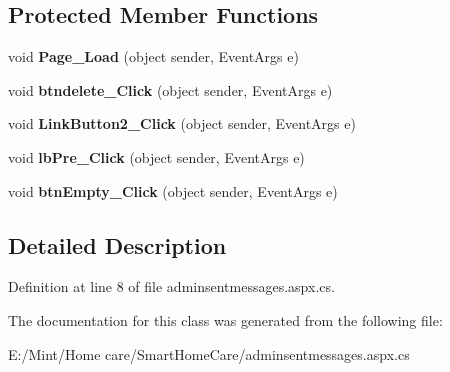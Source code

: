 \subsection*{Protected Member Functions}
\begin{DoxyCompactItemize}
\item 
\hypertarget{classadminsentmessages_a002928c0327e8c487949d9e6207b9f2f}{void {\bfseries Page\-\_\-\-Load} (object sender, Event\-Args e)}\label{classadminsentmessages_a002928c0327e8c487949d9e6207b9f2f}

\item 
\hypertarget{classadminsentmessages_a48aac92fad16543e878e38514956d8a6}{void {\bfseries btndelete\-\_\-\-Click} (object sender, Event\-Args e)}\label{classadminsentmessages_a48aac92fad16543e878e38514956d8a6}

\item 
\hypertarget{classadminsentmessages_ad2efc9592870c548d36ef5ba6dd52fd7}{void {\bfseries Link\-Button2\-\_\-\-Click} (object sender, Event\-Args e)}\label{classadminsentmessages_ad2efc9592870c548d36ef5ba6dd52fd7}

\item 
\hypertarget{classadminsentmessages_a2818cf63646056dacf6cc9818174a61d}{void {\bfseries lb\-Pre\-\_\-\-Click} (object sender, Event\-Args e)}\label{classadminsentmessages_a2818cf63646056dacf6cc9818174a61d}

\item 
\hypertarget{classadminsentmessages_a00bf6f729f8e2dcee18a46717e838520}{void {\bfseries btn\-Empty\-\_\-\-Click} (object sender, Event\-Args e)}\label{classadminsentmessages_a00bf6f729f8e2dcee18a46717e838520}

\end{DoxyCompactItemize}


\subsection{Detailed Description}


Definition at line 8 of file adminsentmessages.\-aspx.\-cs.



The documentation for this class was generated from the following file\-:\begin{DoxyCompactItemize}
\item 
E\-:/\-Mint/\-Home care/\-Smart\-Home\-Care/adminsentmessages.\-aspx.\-cs\end{DoxyCompactItemize}
